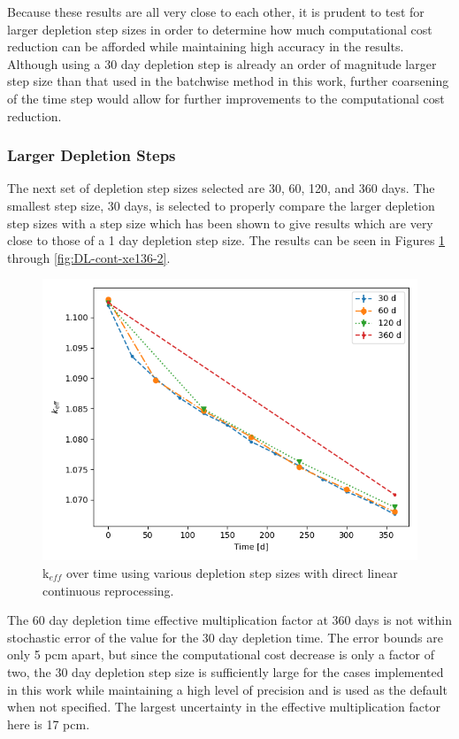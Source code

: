 Because these results are all very close to each other, it is prudent to test for larger depletion step sizes in order to determine how much computational cost reduction can be afforded while maintaining high accuracy in the results. Although using a 30 day depletion step is already an order of magnitude larger step size than that used in the batchwise method in this work, further coarsening of the time step would allow for further improvements to the computational cost reduction.

\subsubsection{Larger Depletion Steps}

The next set of depletion step sizes selected are 30, 60, 120, and 360 days. The smallest step size, 30 days, is selected to properly compare the larger depletion step sizes with a step size which has been shown to give results which are very close to those of a 1 day depletion step size. The results can be seen in Figures \ref{fig:DL-cont-k-2} through \ref{fig:DL-cont-xe136-2}. 

\begin{figure}[H]
  \centering
  \includegraphics[scale=0.7]{images/DL_NSTEP_keff-large.png}
  \caption{k$_{eff}$ over time using various depletion step sizes with direct linear continuous reprocessing.}
   \label{fig:DL-cont-k-2}
\end{figure}

The 60 day depletion time effective multiplication factor at 360 days is not within stochastic error of the value for the 30 day depletion time. The error bounds are only 5 pcm apart, but since the computational cost decrease is only a factor of two, the 30 day depletion step size is sufficiently large for the cases implemented in this work while maintaining a high level of precision and is used as the default when not specified.
The largest uncertainty in the effective multiplication factor here is 17 pcm.

